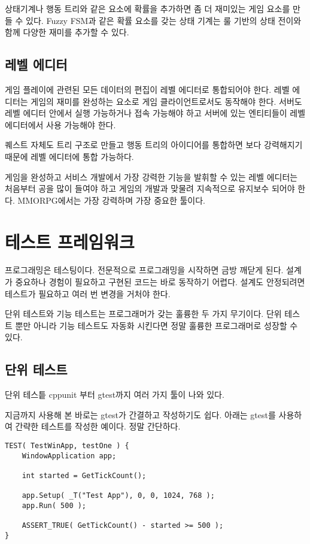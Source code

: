 \documentclass[chapter,kosection, 10.5pt, romanfixed, a4paper]{oblivoir}
\begin{document}
상태기계나 행동 트리와 같은 요소에 확률을 추가하면 좀 더 재미있는 게임 요소를 만들 수 있다. 
Fuzzy FSM과 같은 확률 요소를 갖는 상태 기계는 룰 기반의 상태 전이와 함께 다양한 재미를 추가할 수 있다. 

\subsection{레벨 에디터}

게임 플레이에 관련된 모든 데이터의 편집이 레벨 에디터로 통합되어야 한다. 레벨 에디터는 게임의 
재미를 완성하는 요소로 게임 클라이언트로서도 동작해야 한다. 서버도 레벨 에디터 안에서 실행 가능하거나
접속 가능해야 하고 서버에 있는 엔티티들이 레벨 에디터에서 사용 가능해야 한다. 

퀘스트 자체도 트리 구조로 만들고 행동 트리의 아이디어를 통합하면 보다 강력해지기 때문에 레벨 에디터에
통합 가능하다.

게임을 완성하고 서비스 개발에서 가장 강력한 기능을 발휘할 수 있는 레벨 에디터는 처음부터 공을 많이 
들여야 하고 게임의 개발과 맞물려 지속적으로 유지보수 되어야 한다. MMORPG에서는 가장 강력하며 가장 
중요한 툴이다. 


\section{테스트 프레임워크}

프로그래밍은 테스팅이다. 전문적으로 프로그래밍을 시작하면 금방 깨닫게 된다. 
설계가 중요하나 경험이 필요하고 구현된 코드는 바로 동작하기 어렵다. 설계도 
안정되려면 테스트가 필요하고 여러 번 변경을 거처야 한다. 

단위 테스트와 기능 테스트는 프로그래머가 갖는 훌륭한 두 가지 무기이다. 단위 테스트 뿐만 
아니라 기능 테스트도 자동화 시킨다면 정말 훌륭한 프로그래머로 성장할 수 있다. 

\subsection{단위 테스트}

단위 테스틑 cppunit 부터 gtest까지 여러 가지 툴이 나와 있다. 

지금까지 사용해 본 바로는 gtest가 간결하고 작성하기도 쉽다. 아래는 gtest를 
사용하여 간략한 테스트를 작성한 예이다. 정말 간단하다.

\begin{verbatim}
TEST( TestWinApp, testOne ) {
	WindowApplication app;

	int started = GetTickCount();

	app.Setup( _T("Test App"), 0, 0, 1024, 768 );
	app.Run( 500 );

	ASSERT_TRUE( GetTickCount() - started >= 500 );
}
\end{verbatim}
\end{document}
